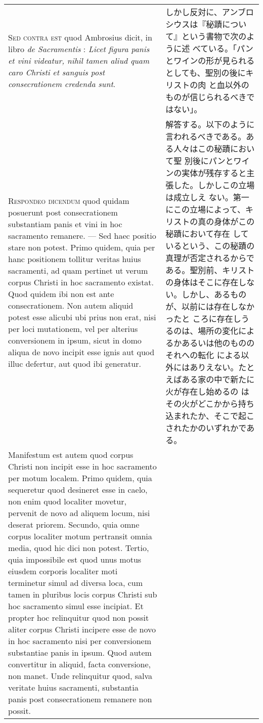 \documentclass[10pt]{jsarticle} %
\begin{document}
\begin{longtable}{p{21em}p{21em}}
\\



{\scshape Sed contra est} quod Ambrosius dicit, in libro {\itshape de
Sacramentis} : {\itshape Licet figura panis et vini videatur, nihil
tamen aliud quam caro Christi et sanguis post consecrationem credenda
sunt}.

&

しかし反対に、アンブロシウスは『秘蹟について』という書物で次のように述
べている。「パンとワインの形が見られるとしても、聖別の後にキリストの肉
と血以外のものが信じられるべきではない」。

\\



{\scshape Respondeo dicendum} quod quidam posuerunt post
consecrationem substantiam panis et vini in hoc sacramento
remanere. --- Sed haec positio stare non potest. Primo quidem, quia
per hanc positionem tollitur veritas huius sacramenti, ad quam
pertinet ut verum corpus Christi in hoc sacramento existat. Quod
quidem ibi non est ante consecrationem. Non autem aliquid potest esse
alicubi ubi prius non erat, nisi per loci mutationem, vel per alterius
conversionem in ipsum, sicut in domo aliqua de novo incipit esse ignis
aut quod illuc defertur, aut quod ibi generatur.

&

解答する。以下のように言われるべきである。ある人々はこの秘蹟において聖
別後にパンとワインの実体が残存すると主張した。しかしこの立場は成立しえ
ない。第一にこの立場によって、キリストの真の身体がこの秘蹟において存在
しているという、この秘蹟の真理が否定されるからである。聖別前、キリスト
の身体はそこに存在しない。しかし、あるものが、以前には存在しなかったと
ころに存在しうるのは、場所の変化によるかあるいは他のもののそれへの転化
による以外にはありえない。たとえばある家の中で新たに火が存在し始めるの
はその火がどこかから持ち込まれたか、そこで起こされたかのいずれかである。


\\

Manifestum est autem quod corpus Christi non incipit esse in hoc
sacramento per motum localem. Primo quidem, quia sequeretur quod
desineret esse in caelo, non enim quod localiter movetur, pervenit de
novo ad aliquem locum, nisi deserat priorem. Secundo, quia omne corpus
localiter motum pertransit omnia media, quod hic dici non
potest. Tertio, quia impossibile est quod unus motus eiusdem corporis
localiter moti terminetur simul ad diversa loca, cum tamen in pluribus
locis corpus Christi sub hoc sacramento simul esse incipiat. Et
propter hoc relinquitur quod non possit aliter corpus Christi incipere
esse de novo in hoc sacramento nisi per conversionem substantiae panis
in ipsum. Quod autem convertitur in aliquid, facta conversione, non
manet. Unde relinquitur quod, salva veritate huius sacramenti,
substantia panis post consecrationem remanere non possit.



\end{longtable}
\end{document}
